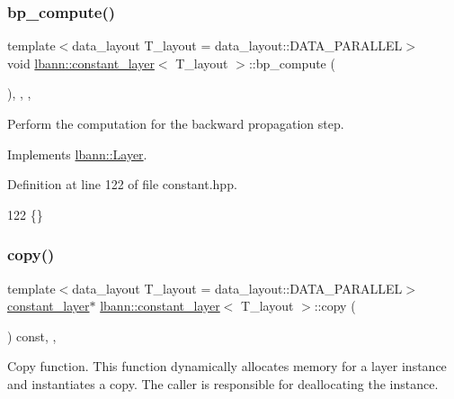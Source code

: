 \subsubsection{\texorpdfstring{bp\+\_\+compute()}{bp\_compute()}}
{\footnotesize\ttfamily template$<$data\+\_\+layout T\+\_\+layout = data\+\_\+layout\+::\+D\+A\+T\+A\+\_\+\+P\+A\+R\+A\+L\+L\+EL$>$ \\
void \hyperlink{classlbann_1_1constant__layer}{lbann\+::constant\+\_\+layer}$<$ T\+\_\+layout $>$\+::bp\+\_\+compute (\begin{DoxyParamCaption}{ }\end{DoxyParamCaption})\hspace{0.3cm}{\ttfamily [inline]}, {\ttfamily [override]}, {\ttfamily [protected]}, {\ttfamily [virtual]}}

Perform the computation for the backward propagation step. 

Implements \hyperlink{classlbann_1_1Layer_a7442e01f9ee1294df2de811efcf5171e}{lbann\+::\+Layer}.



Definition at line 122 of file constant.\+hpp.


\begin{DoxyCode}
122 \{\}
\end{DoxyCode}
\mbox{\label{classlbann_1_1constant__layer_adf44af96fef92b565a933b04fecd0fa2}} 
\subsubsection{\texorpdfstring{copy()}{copy()}}
{\footnotesize\ttfamily template$<$data\+\_\+layout T\+\_\+layout = data\+\_\+layout\+::\+D\+A\+T\+A\+\_\+\+P\+A\+R\+A\+L\+L\+EL$>$ \\
\hyperlink{classlbann_1_1constant__layer}{constant\+\_\+layer}$\ast$ \hyperlink{classlbann_1_1constant__layer}{lbann\+::constant\+\_\+layer}$<$ T\+\_\+layout $>$\+::copy (\begin{DoxyParamCaption}{ }\end{DoxyParamCaption}) const\hspace{0.3cm}{\ttfamily [inline]}, {\ttfamily [override]}, {\ttfamily [virtual]}}

Copy function. This function dynamically allocates memory for a layer instance and instantiates a copy. The caller is responsible for deallocating the instance. 


